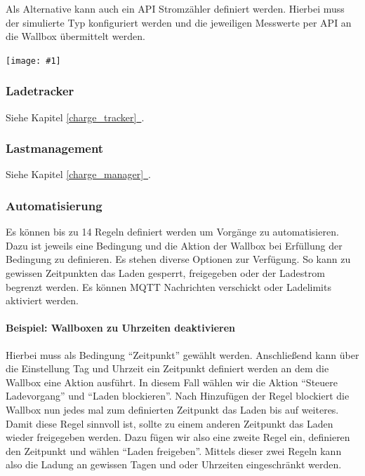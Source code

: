 \documentclass[a4paper,10pt]{article}
\newcommand{\gfx}[1]{\texttt{[image: \#1]}}
\newcommand*{\fullref}[1]{\hyperref[{#1}]{\ref*{#1}~\nameref*{#1}}}
\begin{document}
\begin{multicols*}{2}
	Als Alternative kann auch ein API Stromzähler definiert werden. Hierbei muss
	der simulierte Typ konfiguriert werden und die jeweiligen Messwerte per API
	an die Wallbox übermittelt werden.


	\gfx{./img_warp2/resized/web_meter}

	\vspace{-0.4cm}
	\subsubsection{Ladetracker}
	Siehe Kapitel \fullref{charge_tracker}.
	\vspace{-0.2cm}
	\subsubsection{Lastmanagement}
	Siehe Kapitel \fullref{charge_manager}.
	 \vspace{-0.2cm}
	\subsubsection{Automatisierung}
	Es können bis zu 14 Regeln definiert werden um Vorgänge zu automatisieren.
	Dazu ist jeweils eine Bedingung und die Aktion der Wallbox bei Erfüllung der
	Bedingung zu definieren. Es stehen diverse Optionen zur Verfügung. So kann
	zu gewissen Zeitpunkten das Laden gesperrt, freigegeben oder der Ladestrom
	begrenzt werden. Es können MQTT Nachrichten verschickt oder Ladelimits
	aktiviert werden.

	\paragraph{Beispiel: Wallboxen zu Uhrzeiten deaktivieren}
	Hierbei muss als Bedingung \enquote{Zeitpunkt} gewählt werden. Anschließend
	kann über die Einstellung Tag und Uhrzeit ein Zeitpunkt definiert werden an
	dem die Wallbox eine Aktion ausführt. In diesem Fall wählen wir die Aktion
	\enquote{Steuere Ladevorgang} und \enquote{Laden blockieren}. Nach
	Hinzufügen der Regel blockiert die Wallbox nun jedes mal zum definierten
	Zeitpunkt das Laden bis auf weiteres. Damit diese Regel sinnvoll ist, sollte
	zu einem anderen Zeitpunkt das Laden wieder freigegeben werden. Dazu fügen
	wir also eine zweite Regel ein, definieren den Zeitpunkt und wählen
	\enquote{Laden freigeben}. Mittels dieser zwei Regeln kann also die Ladung
	an gewissen Tagen und oder Uhrzeiten eingeschränkt werden.




\end{multicols*}
\end{document}
